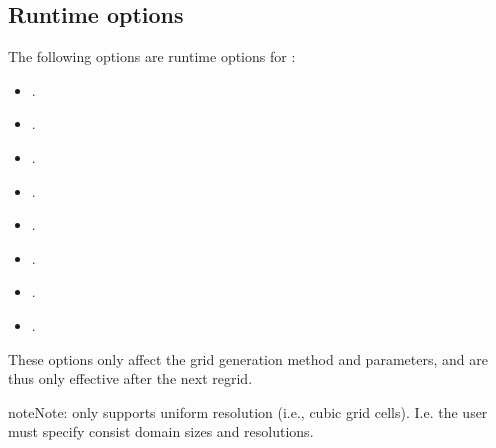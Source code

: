 \documentclass[letterpaper,10pt,english]{sphinxmanual}
\begin{document}
\subsection{Runtime options}
\label{\detokenize{Source/AmrMesh:runtime-options}}
\sphinxAtStartPar
The following options are runtime options for :
\begin{itemize}
\item {} 
\sphinxAtStartPar
{}.

\item {} 
\sphinxAtStartPar
{}.

\item {} 
\sphinxAtStartPar
{}.

\item {} 
\sphinxAtStartPar
{}.

\item {} 
\sphinxAtStartPar
{}.

\item {} 
\sphinxAtStartPar
{}.

\item {} 
\sphinxAtStartPar
{}.

\item {} 
\sphinxAtStartPar
{}.

\end{itemize}

\sphinxAtStartPar
These options only affect the grid generation method and parameters, and are thus only effective after the next regrid.

\begin{sphinxadmonition}{note}{Note:}
\sphinxAtStartPar
{} only supports uniform resolution (i.e., cubic grid cells).
I.e. the user must specify consist domain sizes and resolutions.
\end{sphinxadmonition}

\sphinxstepscope
\end{document}
